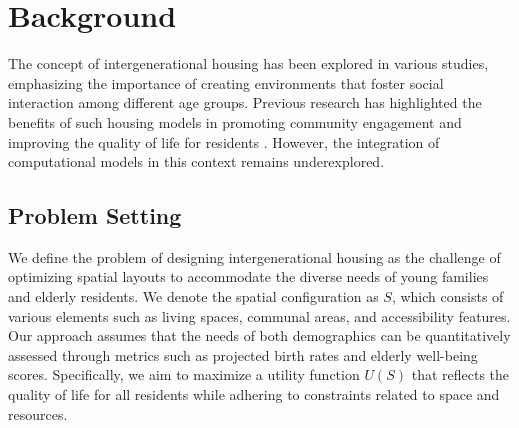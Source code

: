 \documentclass{article} %
\begin{document}


\section{Background}
\label{sec:background}
The concept of intergenerational housing has been explored in various studies, emphasizing the importance of creating environments that foster social interaction among different age groups. Previous research has highlighted the benefits of such housing models in promoting community engagement and improving the quality of life for residents \citep{goodfellow2016deep}. However, the integration of computational models in this context remains underexplored.

\subsection{Problem Setting}
We define the problem of designing intergenerational housing as the challenge of optimizing spatial layouts to accommodate the diverse needs of young families and elderly residents. We denote the spatial configuration as \( S \), which consists of various elements such as living spaces, communal areas, and accessibility features. Our approach assumes that the needs of both demographics can be quantitatively assessed through metrics such as projected birth rates and elderly well-being scores. Specifically, we aim to maximize a utility function \( U(S) \) that reflects the quality of life for all residents while adhering to constraints related to space and resources.
\end{document}
